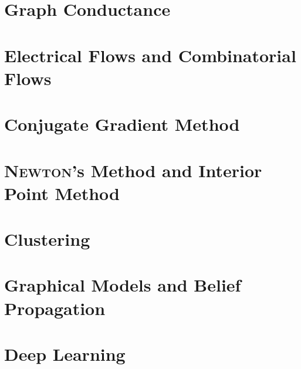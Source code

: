 \chapter{Graph Conductance}
    
    
\chapter{Electrical Flows and Combinatorial Flows}
    

\chapter{Conjugate Gradient Method}
    

\chapter{\textsc{Newton}'s Method and Interior Point Method}
\chapter{Clustering}
\chapter{Graphical Models and Belief Propagation}
\chapter{Deep Learning}
    



\nocite{*}







